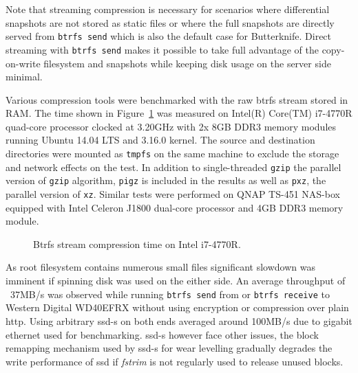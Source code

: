 \documentclass[a4paper,11pt]{kth-mag}
\begin{document}
Note that streaming compression is necessary for scenarios
where differential snapshots are not stored as static files
or where the full snapshots are directly served from
\lstinline!btrfs send! which is also the default case for Butterknife.
Direct streaming with \lstinline!btrfs send! makes it possible
to take full advantage of the copy-on-write filesystem
and snapshots while keeping disk usage on the server side minimal.

Various compression tools were benchmarked with
the raw \acrshort{btrfs} stream stored in RAM.
The time shown in Figure~\ref{fig:compression-benchmark-real-time}
was measured on Intel(R) Core(TM) i7-4770R quad-core processor
clocked at 3.20GHz with 2x 8GB DDR3 memory modules running
Ubuntu 14.04 LTS and 3.16.0 kernel.
The source and destination directories were
mounted as \lstinline!tmpfs! on the same
machine to exclude the
storage and network effects on the test.
In addition to single-threaded \lstinline!gzip!
the parallel version of \lstinline!gzip! algorithm,
\lstinline!pigz! is included in the results as well as \lstinline!pxz!,
the parallel version of \lstinline!xz!.
Similar tests were performed on QNAP TS-451 NAS-box equipped with
Intel Celeron J1800 dual-core processor and 4GB DDR3 memory module.
\\

\begin{figure}
\caption{Btrfs stream compression time on Intel i7-4770R.}
\label{fig:compression-benchmark-real-time}
\end{figure}


As root filesystem contains numerous small files significant
slowdown was imminent if spinning disk was used on the either side.
An average throughput of ~37MB/s was observed while
running \lstinline!btrfs send! from or \lstinline!btrfs receive! to
Western Digital WD40EFRX without using encryption or compression
over plain \acrshort{http}.
Using arbitrary \acrshort{ssd}-s on both ends averaged around 100MB/s
due to gigabit ethernet used for benchmarking.
\acrshort{ssd}-s however face other issues,
the block remapping mechanism used by \acrshort{ssd}-s
for wear levelling gradually degrades the write performance
of \acrshort{ssd} if \emph{fstrim} \cite{fstrim} is not
regularly used to release unused blocks.
\end{document}
